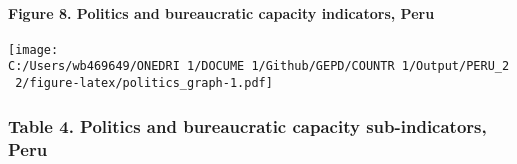 \documentclass[twocolumn]{article}
\let\oldparagraph\paragraph
\renewcommand{\paragraph}[1]{\oldparagraph{#1}\mbox{}}
\begin{document}

\hypertarget{figure-8.-politics-and-bureaucratic-capacity-indicators-peru}{%
\paragraph{Figure 8. Politics and bureaucratic capacity indicators,
Peru}\label{figure-8.-politics-and-bureaucratic-capacity-indicators-peru}}

\texttt{[image: C:/Users/wb469649/ONEDRI~1/DOCUME~1/Github/GEPD/COUNTR~1/Output/PERU\_2~2/figure-latex/politics\_graph-1.pdf]}

\hypertarget{table-4.-politics-and-bureaucratic-capacity-sub-indicators-peru}{%
\subsubsection{Table 4. Politics and bureaucratic capacity
sub-indicators,
Peru}\label{table-4.-politics-and-bureaucratic-capacity-sub-indicators-peru}}
\end{document}
